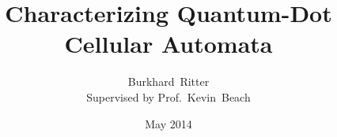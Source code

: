 \documentclass[11pt]{book}
\begin{document}
\graphicspath{}

\title{Characterizing Quantum-Dot Cellular Automata}
\author{Burkhard~Ritter\\Supervised by Prof.~Kevin~Beach}
\date{May 2014}
\maketitle

\tableofcontents


\newcommand{\ket}[1]{\left|#1\right>}
\newcommand{\bra}[1]{\left<#1\right|}

%



{}

\end{document}
